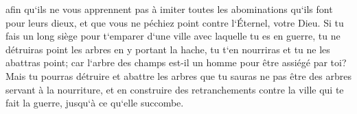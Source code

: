 \verse afin qu`ils ne vous apprennent pas à imiter toutes les abominations qu`ils font pour leurs dieux, et que vous ne péchiez point contre l`Éternel, votre Dieu. 
\verse Si tu fais un long siège pour t`emparer d`une ville avec laquelle tu es en guerre, tu ne détruiras point les arbres en y portant la hache, tu t`en nourriras et tu ne les abattras point; car l`arbre des champs est-il un homme pour être assiégé par toi? 
\verse Mais tu pourras détruire et abattre les arbres que tu sauras ne pas être des arbres servant à la nourriture, et en construire des retranchements contre la ville qui te fait la guerre, jusqu`à ce qu`elle succombe. 

\chapter{}

